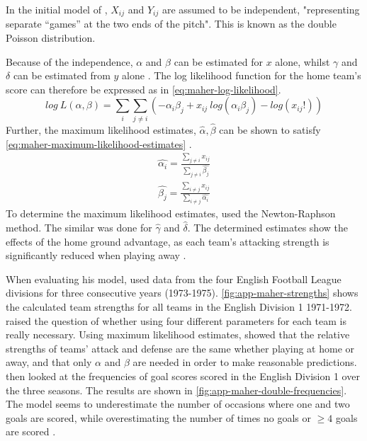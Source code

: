 In the initial model of \citet{bib:maher-1982}, $X_{ij}$  and $Y_{ij}$ are assumed to be independent, "representing separate “games” at the two ends of the pitch". This is known as the double Poisson distribution.

Because of the independence, $\alpha$ and $\beta$ can be estimated for $x$ alone, whilst $\gamma$ and $\delta$ can be estimated from $y$ alone \citep{bib:maher-1982}. The log likelihood function for the home team's score can therefore be expressed as in \cref{eq:maher-log-likelihood}.
\begin{equation}
    log\ L(\alpha, \beta) = \sum_{i} \sum_{j \neq i} (-\alpha_{i} \beta_{j} + x_{ij}\ log(\alpha_{i}\beta_{j}) - log(x_{ij}!))
    \label{eq:maher-log-likelihood}
\end{equation}
Further, the maximum likelihood estimates, $\hat{\alpha}, \hat{\beta}$ can be shown to satisfy \cref{eq:maher-maximum-likelihood-estimates} \citep{bib:maher-1982}.
\begin{equation}
    \begin{aligned}
        \hat{\alpha_{i}} = \frac{\sum_{j \neq i} x_{ij}}{\sum_{j \neq i} \hat{\beta_{j}}} \\
        \hat{\beta_{j}} = \frac{\sum_{i \neq j} x_{ij}}{\sum_{i \neq j} \hat{\alpha_{i}}}
    \end{aligned}
    \label{eq:maher-maximum-likelihood-estimates}
\end{equation}
To determine the maximum likelihood estimates, \citet{bib:maher-1982} used the Newton-Raphson method. The similar was done for $\hat{\gamma}$ and $\hat{\delta}$. The determined estimates show the effects of the home ground advantage, as each team's attacking strength is significantly reduced when playing away \citep{bib:maher-1982}.

When evaluating his model, \citet{bib:maher-1982} used data from the four English Football League divisions for three consecutive years (1973-1975). \cref{fig:app-maher-strengths} shows the calculated team strengths for all teams in the English Division 1 1971-1972. \citet{bib:maher-1982} raised the question of whether using four different parameters for each team is really necessary. Using maximum likelihood estimates, \citet{bib:maher-1982} showed that the relative strengths of teams' attack and defense are the same whether playing at home or away, and that only $\alpha$ and $\beta$ are needed in order to make reasonable predictions. \citet{bib:maher-1982} then looked at the frequencies of goal scores scored in the English Division 1 over the three seasons. The results are shown in \cref{fig:app-maher-double-frequencies}. The model seems to underestimate the number of occasions where one and two goals are scored, while overestimating the number of times no goals or $\geq 4$ goals are scored \citep{bib:maher-1982}.


